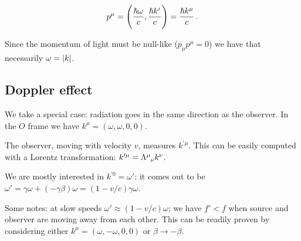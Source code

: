 \documentclass[main.tex]{subfiles}
\begin{document}
\begin{equation}
  p^{\mu} = \qty(\frac{\hbar \omega}{c}, \frac{\hbar k^{i}}{c}) = \frac{\hbar k^{\mu}}{c}\,.
\end{equation}

Since the momentum of light must be null-like (\(p_{\mu } p^{\mu } = 0\)) we have that necessarily \(\omega = \abs{k} \).

\subsection{Doppler effect}

We take a special case: radiation goes in the same direction as the observer.
In the \(O\) frame we have \(k^{\mu} = (\omega, \omega,0,0)\).

The observer, moving with velocity \(v\), measures \(k^{\prime \mu}\). This can be easily computed with a Lorentz transformation: \(k^{\prime \mu} = \tensor{\Lambda}{^\mu_\nu} k^\nu\).

We are mostly interested in \(k^{\prime 0} = \omega'\): it comes out to be \(\omega' = \gamma \omega + (- \gamma \beta)\omega = (1- v/c) \gamma \omega\).

Some notes: at slow speeds \(\omega' \approx (1-v/c) \omega\); we have \(f'<f\) when source and observer are moving away from each other. This can be readily proven by considering either \(k^{\mu } = (\omega , -\omega , 0,0)\) or \(\beta \rightarrow - \beta \). 
\end{document}
